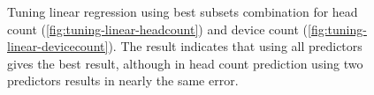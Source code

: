 	\begin{figure}[H]
		\begin{adjustwidth}{-3cm}{}
		\centering
		\end{adjustwidth}
		\caption[Tuning linear regression.]
		{Tuning linear regression using best subsets combination for head count (\ref{fig:tuning-linear-headcount}) and device count (\ref{fig:tuning-linear-devicecount}). The result indicates that using all predictors gives the best result, although in head count prediction using two predictors results in nearly the same error.}
		\label{fig:tuning-linear}
	\end{figure}

